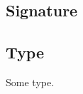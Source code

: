 \subsection{Signature\label{Nested-F--signature}}%
\subsection{Type\label{Nested-F--type_3}}%
\label{Nested-F--type-t}\begin{ocamlindent}Some type.\end{ocamlindent}%
\medbreak


